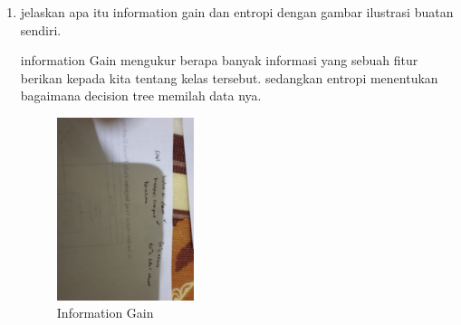 \begin{enumerate}
            \item jelaskan apa itu information gain dan entropi dengan gambar ilustrasi buatan sendiri.\par
            information Gain mengukur berapa banyak informasi yang sebuah fitur berikan kepada kita tentang kelas tersebut. sedangkan entropi menentukan bagaimana decision tree memilah data nya.
            \begin{figure}[H]
                \includegraphics[width=4cm]{figures/1174040/chapter2/info.jpeg}
                \centering
                \caption{Information Gain}
            \end{figure}

        \end{enumerate}
